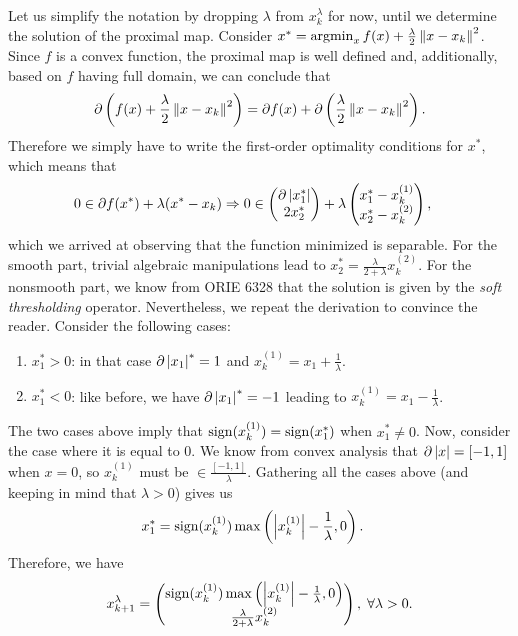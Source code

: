 \documentclass[10pt]{article}
\begin{document}
\begin{Exercise}
		Let us simplify the notation by dropping $\lambda$ from $x_k^{\lambda}$
		for now, until we determine the solution of the proximal map.
		Consider $x^* = \operatorname*{argmin}_{x} f(x) + \frac{\lambda}{2} \left \| x - x_k \right \|^2$.
		Since $f$ is a convex function, the proximal map is well defined and,
		additionally, based on $f$ having full domain, we can conclude that
		\[
			\partial \left(f(x) + \frac{\lambda}{2} \left \| x - x_k \right \|^2 \right)
			= \partial f(x) + \partial \left( \frac{\lambda}{2} \left \| x -
			x_k \right \|^2 \right).
		\]
		Therefore we simply have to write the first-order optimality conditions
		for $x^*$, which means that
		\begin{align*}
			0 &\in \partial f(x^*) + \lambda ( x^* - x_k ) \Rightarrow
			0 \in \begin{pmatrix} \partial \left| x^*_1 \right| \\ 2 x^*_2 \end{pmatrix}
				+ \lambda \begin{pmatrix} x^*_1 - x_k^{(1)} \\ x^*_2 - x_k^{(2)}
				\end{pmatrix},
		\end{align*}
		which we arrived at observing that the function minimized is separable.
		For the smooth part, trivial algebraic manipulations lead to $x_2^* =
		\frac{\lambda}{2 + \lambda} x_k^{(2)}$. For the nonsmooth part, we
		know from ORIE 6328 that the solution is given by the
		\textit{soft thresholding} operator. Nevertheless, we repeat the
		derivation to convince the reader. Consider the following cases:
		\begin{enumerate}
			\item $x^*_1 > 0$: in that case $\partial \left| x_1 \right|^* = 1$ and
				$x_k^{(1)} = x_1 + \frac{1}{\lambda}$.
			\item $x^*_1 < 0$: like before, we have $\partial \left| x_1 \right|^* = -1$
				leading to $x_k^{(1)} = x_1 - \frac{1}{\lambda}$.
		\end{enumerate}
		The two cases above imply that $\mathrm{sign}(x_k^{(1)}) = \mathrm{sign}(x_1^*)$ when
		$x_1^* \neq 0$. Now, consider the case where it is equal to $0$. We
		know from convex analysis that $\partial \left| x \right| = [-1, 1]$ when
		$x = 0$, so $x_k^{(1)}$ must be $\in \frac{[-1, 1]}{\lambda}$. Gathering all the
		cases above (and keeping in mind that $\lambda > 0$) gives us
		\begin{align*}
			x_1^* &= \mathrm{sign}(x_k^{(1)}) \max\left(\left| x_k^{(1)} \right| -
				\frac{1}{\lambda}, 0\right).
		\end{align*}
		Therefore, we have
		\[
			x_{k+1}^{\lambda} = \begin{pmatrix}
				\mathrm{sign}(x_k^{(1)}) \max\left( \left| x_k^{(1)} \right| -
				\frac{1}{\lambda}, 0 \right) \\
				\frac{\lambda}{2 + \lambda} x_k^{(2)}
			\end{pmatrix}, \; \forall \lambda > 0.
		\]


\end{Exercise}
\end{document}
